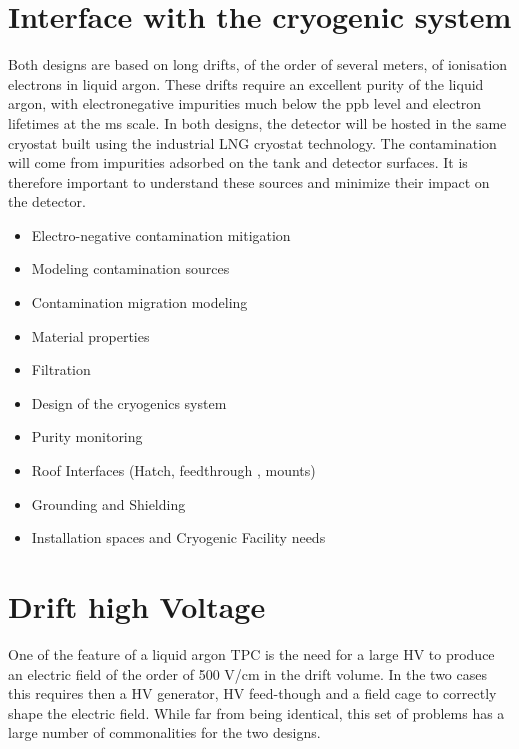 \section{Interface with the cryogenic system}

Both designs are based on long drifts, of the order of several meters, of ionisation electrons in liquid argon. These drifts require an excellent purity of the liquid argon, with electronegative impurities much below the ppb level and electron lifetimes at the ms scale. In both designs, the detector will be hosted in the same cryostat built using the industrial LNG cryostat technology. The contamination will come from impurities adsorbed on the tank and detector surfaces. It is therefore important to understand these sources and minimize their impact on the detector.

\begin{itemize}


\item Electro-negative	
  contamination	
  mitigation	
  	
 
\item Modeling	
  contamination	
  sources	
  

\item Contamination	
  migration	
  modeling	
  	 
\item Material	
  properties	
  
\item Filtration	
  	  
\item Design	  of	 the cryogenics system
  
\item Purity	
  monitoring	
  
\item Roof	
  Interfaces	
  (Hatch,	feedthrough
,	  mounts)	
  
\item Grounding	
  and	
  Shielding	
  
\item Installation	
  spaces	
  and	
  Cryogenic Facility	
  needs	
  

\end{itemize}

\section{Drift high Voltage}

One of the feature of a liquid argon TPC is the need for a large HV to produce an electric field of the order of 500 V/cm in the drift volume. 
In the two cases this requires then a HV generator, HV feed-though and a field cage to correctly shape the electric field. While far from being identical, this set of problems has a large number of commonalities for the two designs. 

